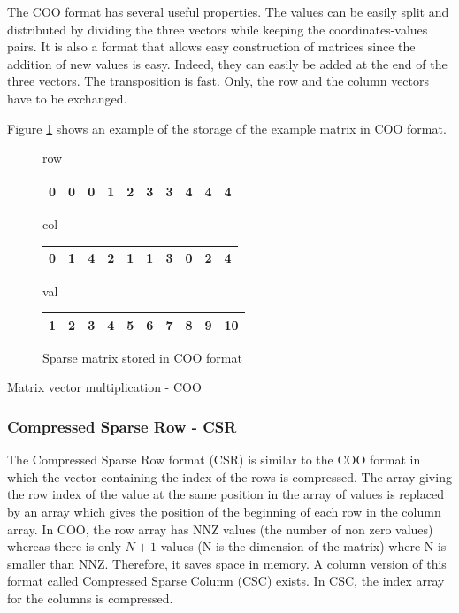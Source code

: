 The COO format has several useful properties.
The values can be easily split and distributed by dividing the three vectors while keeping the coordinates-values pairs.
It is also a format that allows easy construction of matrices since the addition of new values is easy.
Indeed, they can easily be added at the end of the three vectors.
The transposition is fast.
Only, the row and the column vectors have to be exchanged.

Figure \ref{fig:methods:coo_ex} shows an example of the storage of the example matrix in COO format.

\begin{figure}[h]
\centering
row
\bigskip
\begin{tabular}{|cccccccccc|}
\hline
0 & 0 & 0 & 1 & 2 & 3 & 3 & 4 & 4 & 4  \\
\hline
\end{tabular}

col
\bigskip
\begin{tabular}{|cccccccccc|}
\hline
0 & 1 & 4 & 2 & 1 & 1 & 3 & 0 & 2 & 4 \\
\hline
\end{tabular}

val
\bigskip
\begin{tabular}{|cccccccccc|}
\hline
1 & 2 & 3 & 4 & 5 & 6 & 7 & 8 & 9 & 10 \\
\hline
\end{tabular}
\caption{Sparse matrix stored in COO format \label{fig:methods:coo_ex}}
\end{figure}

\begin{algorithm}[h]
	\DontPrintSemicolon
	\caption{Matrix vector multiplication - COO\label{fig:methods:coo_algo}}
\end{algorithm}

\subsubsection{Compressed Sparse Row - CSR}
The Compressed Sparse Row format (CSR) \cite{HacBG1971} \cite{Gusta1972} is similar to the COO format in which the vector containing the index of the rows is compressed.
The array giving the row index of the value at the same position in the array of values is replaced by an array which gives the position of the beginning of each row in the column array.
In COO, the row array has NNZ values (the number of non zero values) whereas there is only $N+1$ values (N is the dimension of the matrix) where N is smaller than NNZ.
Therefore, it saves space in memory.
A column version of this format called Compressed Sparse Column (CSC) exists.
In CSC, the index array for the columns is compressed.

